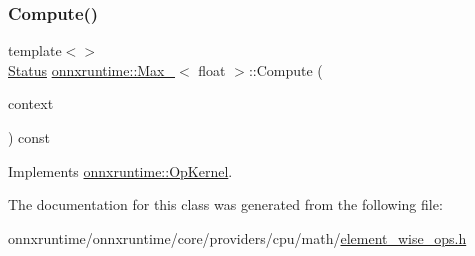 \subsubsection{\texorpdfstring{Compute()}{Compute()}\hspace{0.1cm}{\footnotesize\ttfamily [2/2]}}
{\footnotesize\ttfamily template$<$$>$ \\
\mbox{\hyperlink{classonnxruntime_1_1common_1_1Status}{Status}} \mbox{\hyperlink{classonnxruntime_1_1Max__8}{onnxruntime\+::\+Max\+\_}}$<$ float $>$\+::Compute (\begin{DoxyParamCaption}\item[{\mbox{\hyperlink{classonnxruntime_1_1OpKernelContext}{Op\+Kernel\+Context}} $\ast$}]{context }\end{DoxyParamCaption}) const\hspace{0.3cm}{\ttfamily [virtual]}}



Implements \mbox{\hyperlink{classonnxruntime_1_1OpKernel_a9eca8656a78b1b3ab9d3351a12798650}{onnxruntime\+::\+Op\+Kernel}}.



The documentation for this class was generated from the following file\+:\begin{DoxyCompactItemize}
\item 
onnxruntime/onnxruntime/core/providers/cpu/math/\mbox{\hyperlink{element__wise__ops_8h}{element\+\_\+wise\+\_\+ops.\+h}}\end{DoxyCompactItemize}
